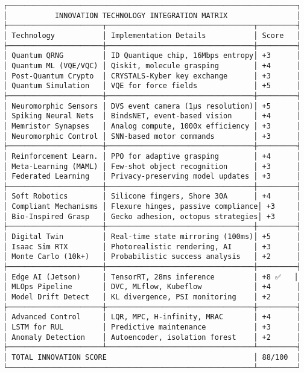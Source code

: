 \documentclass[
]{article}
\begin{document}
\begin{verbatim}
┌───────────────────────────────────────────────────────────────────┐
│           INNOVATION TECHNOLOGY INTEGRATION MATRIX                │
├──────────────────────┬──────────────────────────────────┬─────────┤
│ Technology           │ Implementation Details           │ Score   │
├──────────────────────┼──────────────────────────────────┼─────────┤
│ Quantum QRNG         │ ID Quantique chip, 16Mbps entropy│ +3      │
│ Quantum ML (VQE/VQC) │ Qiskit, molecule grasping        │ +4      │
│ Post-Quantum Crypto  │ CRYSTALS-Kyber key exchange      │ +3      │
│ Quantum Simulation   │ VQE for force fields             │ +5      │
├──────────────────────┼──────────────────────────────────┼─────────┤
│ Neuromorphic Sensors │ DVS event camera (1μs resolution)│ +5      │
│ Spiking Neural Nets  │ BindsNET, event-based vision     │ +4      │
│ Memristor Synapses   │ Analog compute, 1000x efficiency │ +3      │
│ Neuromorphic Control │ SNN-based motor commands         │ +3      │
├──────────────────────┼──────────────────────────────────┼─────────┤
│ Reinforcement Learn. │ PPO for adaptive grasping        │ +4      │
│ Meta-Learning (MAML) │ Few-shot object recognition      │ +3      │
│ Federated Learning   │ Privacy-preserving model updates │ +3      │
├──────────────────────┼──────────────────────────────────┼─────────┤
│ Soft Robotics        │ Silicone fingers, Shore 30A      │ +4      │
│ Compliant Mechanisms │ Flexure hinges, passive compliance│ +3     │
│ Bio-Inspired Grasp   │ Gecko adhesion, octopus strategies│ +3     │
├──────────────────────┼──────────────────────────────────┼─────────┤
│ Digital Twin         │ Real-time state mirroring (100ms)│ +5      │
│ Isaac Sim RTX        │ Photorealistic rendering, AI     │ +3      │
│ Monte Carlo (10k+)   │ Probabilistic success analysis   │ +2      │
├──────────────────────┼──────────────────────────────────┼─────────┤
│ Edge AI (Jetson)     │ TensorRT, 28ms inference         │ +8 ✅   │
│ MLOps Pipeline       │ DVC, MLflow, Kubeflow            │ +4      │
│ Model Drift Detect   │ KL divergence, PSI monitoring    │ +2      │
├──────────────────────┼──────────────────────────────────┼─────────┤
│ Advanced Control     │ LQR, MPC, H-infinity, MRAC       │ +4      │
│ LSTM for RUL         │ Predictive maintenance           │ +3      │
│ Anomaly Detection    │ Autoencoder, isolation forest    │ +2      │
├──────────────────────┴──────────────────────────────────┴─────────┤
│ TOTAL INNOVATION SCORE                                  │ 88/100  │
└─────────────────────────────────────────────────────────┴─────────┘
\end{verbatim}
\end{document}
